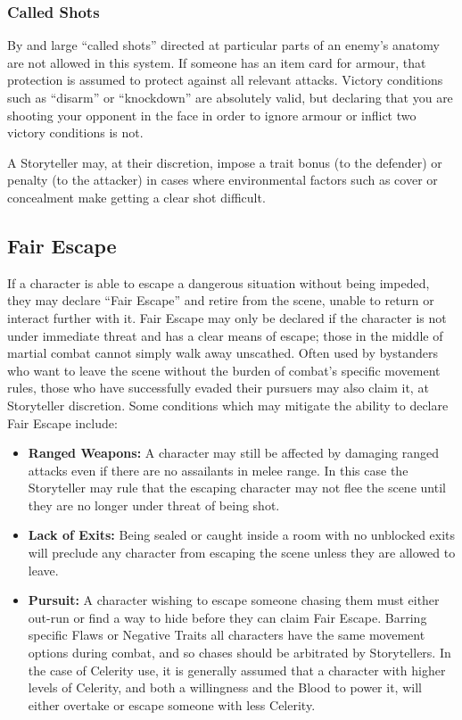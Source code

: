 \subsubsection{Called Shots}
By and large ``called shots'' directed at particular parts of an enemy's anatomy are not allowed in this 
system.  If someone has an item card for armour, that protection is assumed to protect against all 
relevant attacks.  Victory conditions such as ``disarm'' or ``knockdown'' are absolutely valid, but 
declaring that you are shooting your opponent in the face in order to ignore armour or inflict two 
victory conditions is not.

A Storyteller may, at their discretion, impose a trait bonus (to the defender) or penalty (to the 
attacker) in cases where environmental factors such as cover or concealment make getting a clear shot 
difficult.

\subsection{Fair Escape}
If a character is able to escape a dangerous situation without being impeded, they may declare 
``Fair Escape'' and retire from the scene, unable to return or interact further with it.  Fair 
Escape may only be declared if the character is not under immediate threat and has a clear means 
of escape; those in the middle of martial combat cannot simply walk away unscathed.  Often used 
by bystanders who want to leave the scene without the burden of combat's specific movement rules, 
those who have successfully evaded their pursuers may also claim it, at Storyteller discretion.  
Some conditions which may mitigate the ability to declare Fair Escape include:

\begin{itemize}
	\item \textbf{Ranged Weapons:}  A character may still be affected by damaging ranged attacks 
	even if there are no assailants in melee range.  In this case the Storyteller may rule that 
	the escaping character may not flee the scene until they are no longer under threat of being 
	shot.
	\item \textbf{Lack of Exits:}  Being sealed or caught inside a room with no unblocked exits 
	will preclude any character from escaping the scene unless they are allowed to leave.
	\item \textbf{Pursuit:}  A character wishing to escape someone chasing them must either 
	out-run or find a way to hide before they can claim Fair Escape.  Barring specific Flaws or 
	Negative Traits all characters have the same movement options during combat, and so chases 
	should be arbitrated by Storytellers.  In the case of Celerity use, it is generally assumed that 
	a character with higher levels of Celerity, and both a willingness and the Blood to power it, 
	will either overtake or escape someone with less Celerity.
\end{itemize}

